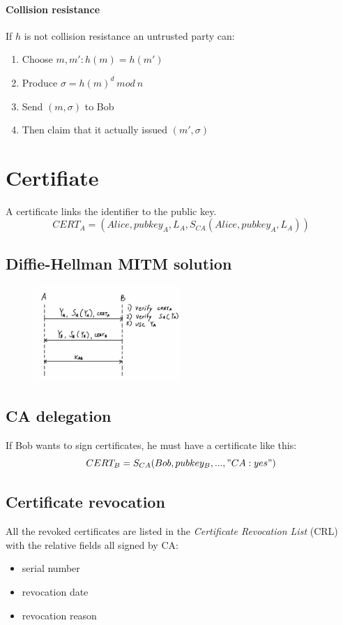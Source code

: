 \documentclass[a4paper,12pt]{article}
\begin{document}
\paragraph{Collision resistance}
If $h$ is not collision resistance an untrusted party can:
\begin{enumerate}
	\item Choose $m, m' : h(m) = h(m')$
	\item Produce $\sigma = h(m)^d\ mod\ n$
	\item Send $(m, \sigma)$ to Bob
	\item Then claim that it actually issued $(m', \sigma)$
\end{enumerate}

\section{Certifiate}
A certificate links the identifier to the public key.
$$ CERT_A = (Alice, pubkey_A, L_A, S_{CA}(Alice, pubkey_A, L_A))$$

\subsection{Diffie-Hellman MITM solution}

\begin{figure}[H]
  \centering
  \includegraphics[width=0.5\textwidth]{img/dh-cert}
\end{figure}

\subsection{CA delegation}
If Bob wants to sign certificates, he must have a certificate like this:
$$ CERT_B = S_{CA}(Bob, pubkey_B, ..., "CA:yes")$$

\subsection{Certificate revocation}
All the revoked certificates are listed in the \textit{Certificate Revocation List} (CRL) with the relative fields all signed by CA:
\begin{itemize}
	\item serial number
	\item revocation date
	\item revocation reason
\end{itemize}
\end{document}
